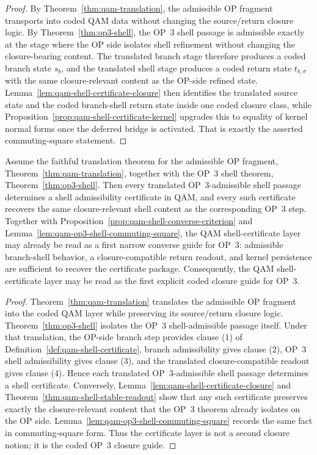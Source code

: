 \begin{proof}
By Theorem~\ref{thm:qam-translation}, the admissible OP fragment transports into coded QAM data without changing the source/return closure logic. By Theorem~\ref{thm:op3-shell}, the OP~3 shell passage is admissible exactly at the stage where the OP side isolates shell refinement without changing the closure-bearing content. The translated branch stage therefore produces a coded branch state $s_b$, and the translated shell stage produces a coded return state $t_{b,\sigma}$ with the same closure-relevant content as the OP-side refined state. Lemma~\ref{lem:qam-shell-certificate-closure} then identifies the translated source state and the coded branch-shell return state inside one coded closure class, while Proposition~\ref{prop:qam-shell-certificate-kernel} upgrades this to equality of kernel normal forms once the deferred bridge is activated. That is exactly the asserted commuting-square statement.
\end{proof}

\begin{theorem}\label{thm:qam-op3-shell-correspondence}
Assume the faithful translation theorem for the admissible OP fragment, Theorem~\ref{thm:qam-translation}, together with the OP~3 shell theorem, Theorem~\ref{thm:op3-shell}. Then every translated OP~3-admissible shell passage determines a shell admissibility certificate in QAM, and every such certificate recovers the same closure-relevant shell content as the corresponding OP~3 step. Together with Proposition~\ref{prop:qam-shell-converse-criterion} and Lemma~\ref{lem:qam-op3-shell-commuting-square}, the QAM shell-certificate layer may already be read as a first narrow converse guide for OP~3: admissible branch-shell behavior, a closure-compatible return readout, and kernel persistence are sufficient to recover the certificate package. Consequently, the QAM shell-certificate layer may be read as the first explicit coded closure guide for OP~3.
\end{theorem}

\begin{proof}
Theorem~\ref{thm:qam-translation} translates the admissible OP fragment into the coded QAM layer while preserving its source/return closure logic. Theorem~\ref{thm:op3-shell} isolates the OP~3 shell-admissible passage itself. Under that translation, the OP-side branch step provides clause (1) of Definition~\ref{def:qam-shell-certificate}, branch admissibility gives clause (2), OP~3 shell admissibility gives clause (3), and the translated closure-compatible readout gives clause (4). Hence each translated OP~3-admissible shell passage determines a shell certificate. Conversely, Lemma~\ref{lem:qam-shell-certificate-closure} and Theorem~\ref{thm:qam-shell-stable-readout} show that any such certificate preserves exactly the closure-relevant content that the OP~3 theorem already isolates on the OP side. Lemma~\ref{lem:qam-op3-shell-commuting-square} records the same fact in commuting-square form. Thus the certificate layer is not a second closure notion; it is the coded OP~3 closure guide.
\end{proof}

